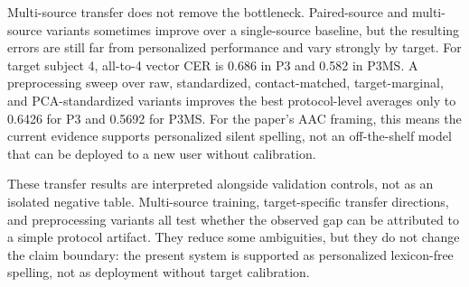 Multi-source transfer does not remove the bottleneck. Paired-source and multi-source variants sometimes improve over a single-source baseline, but the resulting errors are still far from personalized performance and vary strongly by target. For target subject 4, all-to-4 vector CER is 0.686 in P3 and 0.582 in P3MS. A preprocessing sweep over raw, standardized, contact-matched, target-marginal, and PCA-standardized variants improves the best protocol-level averages only to 0.6426 for P3 and 0.5692 for P3MS. For the paper's AAC framing, this means the current evidence supports personalized silent spelling, not an off-the-shelf model that can be deployed to a new user without calibration.


These transfer results are interpreted alongside validation controls, not as an isolated negative table. Multi-source training, target-specific transfer directions, and preprocessing variants all test whether the observed gap can be attributed to a simple protocol artifact. They reduce some ambiguities, but they do not change the claim boundary: the present system is supported as personalized lexicon-free spelling, not as deployment without target calibration.


